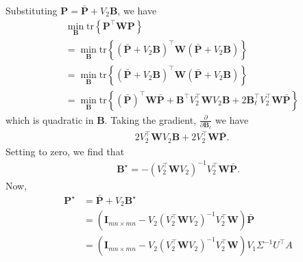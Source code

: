 	Substituting $\mathbf{P} = \bar{\mathbf{P}} + V_2 \mathbf{B}$, we have
	\begin{align}
		&\min_{\mathbf{B}} \mathrm{tr} \left\{ \mathbf{P}^\top \mathbf{W} \mathbf{P}  \right\} \\
		&= \min_{\mathbf{B}} \mathrm{tr} \left\{ (\bar{\mathbf{P}} + V_2\mathbf{B})^\top \mathbf{W} (\bar{\mathbf{P}} + V_2\mathbf{B})  \right\}\\
		&= \min_{\mathbf{B}} \mathrm{tr} \left\{ (\bar{\mathbf{P}} + V_2\mathbf{B})^\top \mathbf{W} (\bar{\mathbf{P}} + V_2\mathbf{B})  \right\}\\
		&= \min_{\mathbf{B}} \mathrm{tr} \left\{ (\bar{\mathbf{P}})^\top \mathbf{W}\bar{\mathbf{P}} + \mathbf{B}^\top V_2^\top \mathbf{W} V_2 \mathbf{B}
		+ 2 \mathbf{B}_\ell^\top V_2^\top \mathbf{W}\bar{\mathbf{P}} \right\}
	\end{align}
	which is quadratic in $\mathbf{B}$.
	Taking the gradient, $\frac{\partial}{\partial \mathbf{B}_\ell}$ we have
	\begin{align}
		&2 V_2^\top \mathbf{W} V_2 \mathbf{B} + 2 V_2^\top \mathbf{W}\bar{\mathbf{P}}.
	\end{align}
	Setting to zero, we find that
	\begin{align}
		\mathbf{B}^\star = - (V_2^\top \mathbf{W} V_2)^{-1} V_2^\top \mathbf{W} \bar{\mathbf{P}}.
	\end{align}
	Now,
	\begin{align}
		\mathbf{P}^\star &= \bar{\mathbf{P}} + V_2 \mathbf{B}^\star \\
		&= (\mathbf{I}_{mn \times mn} - V_2  (V_2^\top \mathbf{W} V_2)^{-1} V_2^\top \mathbf{W}) \bar{\mathbf{P}}\\
		&= (\mathbf{I}_{mn \times mn} - V_2  (V_2^\top \mathbf{W} V_2)^{-1} V_2^\top \mathbf{W}) V_1 \Sigma^{-1} U^\top A
	\end{align}

\endproof

